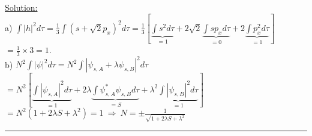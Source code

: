 \noindent
\underline{Solution:}\\

\noindent
a) $\int|h|^2d\tau = \frac{1}{3}\int\left( s + \sqrt{2}p_x\right)^2d\tau = 
\frac{1}{3}\left[\underbrace{\int s^2d\tau}_{= 1} + 2\sqrt{2}\underbrace
{\int sp_xd\tau}_{= 0} + 2\underbrace{\int p_x^2d\tau
}_{= 1}\right]$\\ $= \frac{1}{3}\times 3 = 1$.\\

\noindent
b)
$N^2\int|\psi|^2d\tau = N^2\int|\psi_{s,A} + \lambda\psi_{s,B}|^2d\tau$\\
$= N^2\left[ \underbrace{\int|\psi_{s,A}|^2d\tau}_{= 1}
+ 2\lambda\underbrace{\int\psi^*_{s,A}\psi_{s,B}d\tau}_{= S}
+ \lambda^2\underbrace{\int|\psi_{s,B}|^2d\tau}_{= 1}\right]$\\
$= N^2(1 + 2\lambda S + \lambda^2) = 1~\Rightarrow~N = \pm\frac{1}{\sqrt{1 + 2\lambda S + \lambda^2}}$\\
\hrule\vspace{0.5cm}




